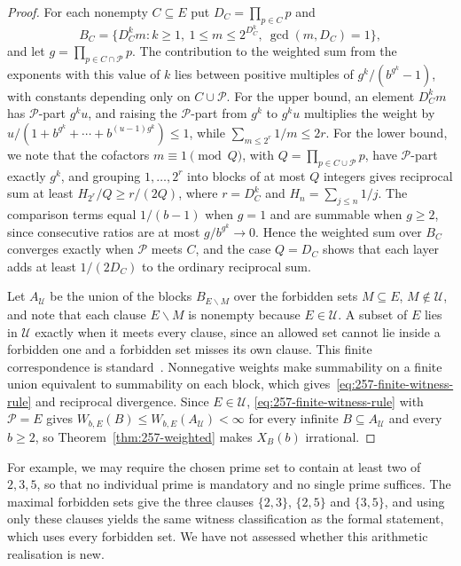\documentclass[11pt]{article}
\theoremstyle{plain}
\theoremstyle{definition}
\theoremstyle{remark}
\begin{document}
\begin{proof}
For each nonempty $C\subseteq E$ put $D_C=\prod_{p\in C}p$ and
\[
 B_C=\{D_C^km:k\ge1,\ 1\le m\le2^{D_C^k},\ \gcd(m,D_C)=1\},
\]
and let $g=\prod_{p\in C\cap\mathcal P}p$. The contribution to the
weighted sum from the exponents with this value of $k$ lies between
positive multiples of $g^k/(b^{g^k}-1)$, with constants depending only
on $C\cup\mathcal P$. For the upper bound, an element $D_C^km$ has
$\mathcal P$-part $g^ku$, and raising the $\mathcal P$-part from $g^k$ to
$g^ku$ multiplies the weight by
$u/(1+b^{g^k}+\cdots+b^{(u-1)g^k})\le1$, while
$\sum_{m\le2^r}1/m\le2r$. For the lower bound, we note that the cofactors $m\equiv1\pmod Q$, with
$Q=\prod_{p\in C\cup\mathcal P}p$, have $\mathcal P$-part exactly $g^k$,
and grouping $1,\dots,2^r$ into blocks of at most $Q$ integers gives
reciprocal sum at least $H_{2^r}/Q\ge r/(2Q)$, where $r=D_C^k$ and
$H_n=\sum_{j\le n}1/j$.  The comparison terms equal $1/(b-1)$ when $g=1$
and are summable when $g\ge2$, since consecutive ratios are at most
$g/b^{g^k}\to0$.  Hence the weighted sum over $B_C$ converges exactly when
$\mathcal P$ meets $C$, and the case $Q=D_C$ shows that each layer adds at
least $1/(2D_C)$ to the ordinary reciprocal sum.

Let $A_{\mathcal U}$ be the union of the blocks $B_{E\smallsetminus M}$ over
the forbidden sets $M\subseteq E$, $M\notin\mathcal U$, and note that each
clause $E\smallsetminus M$ is nonempty because $E\in\mathcal U$.  A subset of $E$ lies
in $\mathcal U$ exactly when it meets every clause, since an allowed set
cannot lie inside a forbidden one and a forbidden set misses its own clause.
This finite correspondence is standard~\cite[Section~2]{sedaghatstephenchindelevitch}.
Nonnegative weights make summability on a finite union equivalent to
summability on each block, which gives~\eqref{eq:257-finite-witness-rule}
and reciprocal divergence.  Since $E\in\mathcal U$,
\eqref{eq:257-finite-witness-rule} with $\mathcal P=E$ gives
$W_{b,E}(B)\le W_{b,E}(A_{\mathcal U})<\infty$ for every infinite
$B\subseteq A_{\mathcal U}$ and every $b\ge2$, so
Theorem~\ref{thm:257-weighted} makes $X_B(b)$ irrational.
\end{proof}

For example, we may require the chosen prime set to contain at least two
of $2,3,5$, so that no individual prime is mandatory and no single prime
suffices. The maximal forbidden sets give the three clauses $\{2,3\}$,
$\{2,5\}$ and $\{3,5\}$, and using only these clauses yields the same
witness classification as the formal statement, which uses every
forbidden set. We have not assessed whether this arithmetic realisation
is new.
\end{document}
